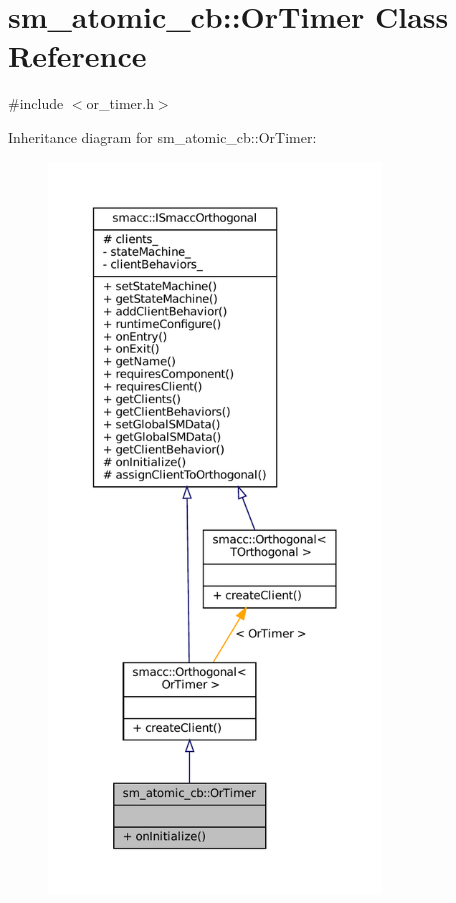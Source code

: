 \hypertarget{classsm__atomic__cb_1_1OrTimer}{}\section{sm\+\_\+atomic\+\_\+cb\+:\+:Or\+Timer Class Reference}
\label{classsm__atomic__cb_1_1OrTimer}


{\ttfamily \#include $<$or\+\_\+timer.\+h$>$}



Inheritance diagram for sm\+\_\+atomic\+\_\+cb\+:\+:Or\+Timer\+:
\nopagebreak
\begin{figure}[H]
\begin{center}
\leavevmode
\includegraphics[height=550pt]{classsm__atomic__cb_1_1OrTimer__inherit__graph}
\end{center}
\end{figure}


